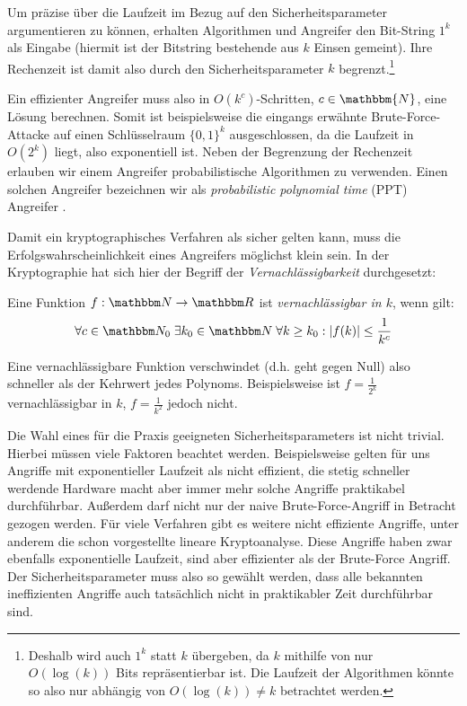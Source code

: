 Um präzise über die Laufzeit im Bezug auf den Sicherheitsparameter
argumentieren zu können, erhalten Algorithmen und Angreifer den
Bit-String $1^k$ als Eingabe (hiermit ist der Bitstring bestehende aus
$k$ Einsen gemeint). Ihre Rechenzeit ist damit also durch den
Sicherheitsparameter $k$ begrenzt.\footnote{Deshalb wird auch $1^k$
  statt $k$ übergeben, da $k$ mithilfe von nur $O(\log(k))$ Bits
  repräsentierbar ist. Die Laufzeit der Algorithmen könnte so also nur
  abhängig von $O(\log(k)) \neq k$ betrachtet werden.}

Ein effizienter Angreifer muss also in $O(k^c)$-Schritten, $c \in
\mathbbm{N}$, eine Lösung berechnen. Somit ist beispielsweise die
eingangs erwähnte Brute-Force-Attacke auf einen Schlüsselraum $\{0,
1\}^{k}$ ausgeschlossen, da die Laufzeit in $O(2^{k})$ liegt, also
exponentiell ist.  Neben der Begrenzung der Rechenzeit erlauben wir
einem Angreifer probabilistische Algorithmen zu verwenden. Einen solchen
Angreifer bezeichnen wir als \emph{probabilistic polynomial time} (PPT)
Angreifer \indexPPTAdv.

Damit ein kryptographisches Verfahren als sicher gelten kann, muss die
Erfolgswahrscheinlichkeit eines Angreifers möglichst \glqq klein\grqq{}
sein. In der Kryptographie hat sich hier der Begriff der
\emph{Vernachlässigbarkeit} \indexNegl durchgesetzt:
\begin{definition}[Vernachlässigbarkeit]\label{def:negl}
 Eine Funktion $f: \N \to \R$
  ist \emph{vernachlässigbar in $k$}, wenn gilt:
  \begin{align*} \forall c \in \N_0 \; \exists k_0 \in \N \;
    \forall k \geq k_0 : \vert f(k) \vert \leq \frac{1}{k^c}
  \end{align*}
\end{definition} Eine vernachlässigbare Funktion \glqq
verschwindet\grqq{} (d.h. geht gegen Null) also schneller als der
Kehrwert jedes Polynoms. Beispielsweise ist $f = \frac{1}{2^k}$
vernachlässigbar in $k$, $f = \frac{1}{k^2}$ jedoch nicht.

Die Wahl eines für die Praxis geeigneten Sicherheitsparameters ist nicht
trivial. Hierbei müssen viele Faktoren beachtet werden. Beispielsweise
gelten für uns Angriffe mit exponentieller Laufzeit als nicht effizient,
die stetig schneller werdende Hardware macht aber immer mehr solche
Angriffe praktikabel durchführbar.  Außerdem darf nicht nur der naive
Brute-Force-Angriff in Betracht gezogen werden. Für viele Verfahren gibt
es weitere nicht effiziente Angriffe, unter anderem die schon
vorgestellte lineare Kryptoanalyse. Diese Angriffe haben zwar ebenfalls
exponentielle Laufzeit, sind aber effizienter als der Brute-Force
Angriff. Der Sicherheitsparameter muss also so gewählt werden, dass alle
bekannten ineffizienten Angriffe auch tatsächlich nicht in praktikabler
Zeit durchführbar sind.

